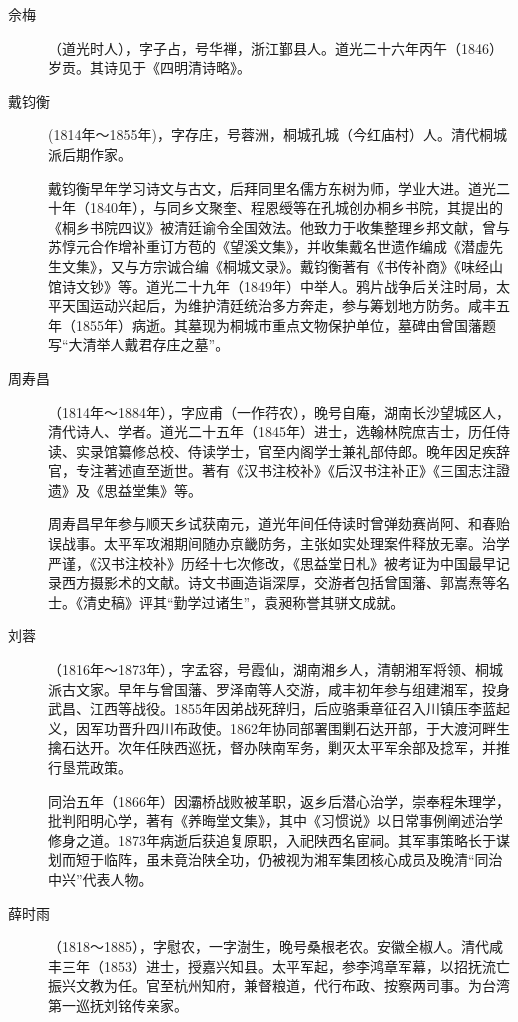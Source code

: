 \begin{description}
  \item[佘梅] （道光时人），字子占，号华禅，浙江鄞县人。道光二十六年丙午（1846）岁贡。其诗见于《四明清诗略》。
  \item[戴钧衡] (1814年～1855年)，字存庄，号蓉洲，桐城孔城（今红庙村）人。清代桐城派后期作家。\par
        戴钧衡早年学习诗文与古文，后拜同里名儒方东树为师，学业大进。道光二十年（1840年），与同乡文聚奎、程恩绶等在孔城创办桐乡书院，其提出的《桐乡书院四议》被清廷谕令全国效法。他致力于收集整理乡邦文献，曾与苏惇元合作增补重订方苞的《望溪文集》，并收集戴名世遗作编成《潜虚先生文集》，又与方宗诚合编《桐城文录》。戴钧衡著有《书传补商》《味经山馆诗文钞》等。道光二十九年（1849年）中举人。鸦片战争后关注时局，太平天国运动兴起后，为维护清廷统治多方奔走，参与筹划地方防务。咸丰五年（1855年）病逝。其墓现为桐城市重点文物保护单位，墓碑由曾国藩题写“大清举人戴君存庄之墓”。
  \item[周寿昌] （1814年～1884年），字应甫（一作荇农），晚号自庵，湖南长沙望城区人，清代诗人、学者。道光二十五年（1845年）进士，选翰林院庶吉士，历任侍读、实录馆纂修总校、侍读学士，官至内阁学士兼礼部侍郎。晚年因足疾辞官，专注著述直至逝世。著有《汉书注校补》《后汉书注补正》《三国志注證遗》及《思益堂集》等。\par
        周寿昌早年参与顺天乡试获南元，道光年间任侍读时曾弹劾赛尚阿、和春贻误战事。太平军攻湘期间随办京畿防务，主张如实处理案件释放无辜。治学严谨，《汉书注校补》历经十七次修改，《思益堂日札》被考证为中国最早记录西方摄影术的文献。诗文书画造诣深厚，交游者包括曾国藩、郭嵩焘等名士。《清史稿》评其“勤学过诸生”，袁昶称誉其骈文成就。
  \item[刘蓉] （1816年～1873年），字孟容，号霞仙，湖南湘乡人，清朝湘军将领、桐城派古文家。早年与曾国藩、罗泽南等人交游，咸丰初年参与组建湘军，投身武昌、江西等战役。1855年因弟战死辞归，后应骆秉章征召入川镇压李蓝起义，因军功晋升四川布政使。1862年协同部署围剿石达开部，于大渡河畔生擒石达开。次年任陕西巡抚，督办陕南军务，剿灭太平军余部及捻军，并推行垦荒政策。\par
        同治五年（1866年）因灞桥战败被革职，返乡后潜心治学，崇奉程朱理学，批判阳明心学，著有《养晦堂文集》，其中《习惯说》以日常事例阐述治学修身之道。1873年病逝后获追复原职，入祀陕西名宦祠。其军事策略长于谋划而短于临阵，虽未竟治陕全功，仍被视为湘军集团核心成员及晚清“同治中兴”代表人物。
  \item[薛时雨] （1818～1885），字慰农，一字澍生，晚号桑根老农。安徽全椒人。清代咸丰三年（1853）进士，授嘉兴知县。太平军起，参李鸿章军幕，以招抚流亡振兴文教为任。官至杭州知府，兼督粮道，代行布政、按察两司事。为台湾第一巡抚刘铭传亲家。\par

\end{description}

